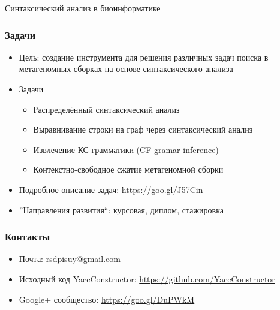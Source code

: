 \documentclass{beamer}
\begin{document}
\begin{frame}[plain,c]
 \transwipe[direction=90]
 \begin{center}
  \Huge Синтаксический анализ в биоинформатике
 \end{center}
\end{frame}

\begin{frame}[fragile]
\transwipe[direction=90]
\frametitle{Задачи}
\begin{itemize}
\item Цель: создание инструмента для решения различных задач поиска в метагеномных сборках на 
основе синтаксического анализа
\item Задачи
\begin{itemize}
\item Распределённый синтаксический анализ
\item Выравнивание строки на граф через синтаксический анализ
\item Извлечение КС-грамматики (CF gramar inference)
\item Контекстно-свободное сжатие метагеномной сборки
\end{itemize}
\item Подробное описание задач: \url{https://goo.gl/J57Cin}
\item ''Направления развития``: курсовая, диплом, стажировка
\end{itemize}
\end{frame}
            
\begin{frame}
\transwipe[direction=90]
\frametitle{Контакты}
\begin{itemize}
  \item Почта: \url{rsdpisuy@gmail.com}
  \item Исходный код YaccConstructor: \url{https://github.com/YaccConstructor}
  \item Google+ сообщество: \url{https://goo.gl/DuPWkM}
\end{itemize}
\end{frame}
\end{document}
